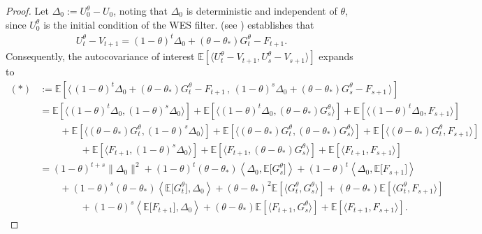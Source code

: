 \documentclass[a4paper, 11pt]{article}
\newcommand{\E}{\mathbb E}
\theoremstyle{definition}
\begin{document}
\begin{proof}
Let $\Delta_0 := U_0^\theta - U_0$, noting that $\Delta_0$ is deterministic and independent of $\theta$, since $U_0^\theta$ is the initial condition of the WES filter.
 (see ) establishes that
\begin{align}
    U_{t}^\theta - V_{t+1} = (1 - \theta)^t \Delta_0 + ( \theta - \theta_* ) G_t^\theta - F_{t+1} .
\end{align}
Consequently, the autocovariance of interest $\E[ \langle U_{t}^\theta - V_{t+1},U_{s}^\theta - V_{s+1} \rangle ]$ expands to
\begin{align}
    (*) & := \E[ \langle \, (1 - \theta)^t \Delta_0 + ( \theta - \theta_* ) G_t^\theta - F_{t+1} \, , \, (1 - \theta)^s \Delta_0 + ( \theta - \theta_* ) G_s^\theta - F_{s+1} \, \rangle ] \\
    & = \E\left[ \langle (1-\theta)^t \Delta_0, (1-\theta)^{s} \Delta_0 \rangle \right] + \E\left[ \langle (1-\theta)^t \Delta_0, (\theta - \theta_*) G_s^\theta \rangle \right] + \E\left[ \langle (1-\theta)^t \Delta_0, F_{s+1} \rangle \right] \\
    & \hspace{25pt} + \E\left[ \langle (\theta - \theta_*) G_t^\theta, (1-\theta)^{s} \Delta_0 \rangle \right] + \E\left[ \langle (\theta - \theta_*) G_t^\theta, (\theta - \theta_*) G_s^\theta \rangle \right] + \E\left[ \langle (\theta - \theta_*) G_t^\theta, F_{s+1} \rangle \right] \\
    & \hspace{50pt} + \E\left[ \langle F_{t+1}, (1-\theta)^{s} \Delta_0 \rangle \right] + \E\left[ \langle F_{t+1}, (\theta - \theta_*) G_s^\theta \rangle \right] + \E\left[ \langle F_{t+1}, F_{s+1} \rangle \right] \\
    & = (1-\theta)^{t+s}\|\Delta_0\|^2 + (1-\theta)^t (\theta - \theta_*) \left\langle \Delta_0, \E\big[ G_s^\theta \big] \right\rangle + (1-\theta)^t \left\langle \Delta_0, \E\big[ F_{s+1} \big] \right\rangle \\
    & \hspace{25pt} + (1-\theta)^s (\theta - \theta_*) \left\langle \E\big[ G_t^\theta \big], \Delta_0 \right\rangle + (\theta - \theta_*)^2 \E\left[ \langle G_t^\theta, G_s^\theta \rangle \right] + (\theta - \theta_*) \E\left[ \langle G_t^\theta, F_{s+1} \rangle \right] \\
    & \hspace{50pt} + (1-\theta)^{s} \left\langle \E\big[ F_{t+1} \big], \Delta_0 \right \rangle + (\theta - \theta_*) \E\left[ \langle F_{t+1}, G_s^\theta \rangle \right] + \E\left[ \langle F_{t+1}, F_{s+1} \rangle \right] .

\end{align}
\end{proof}
\end{document}
